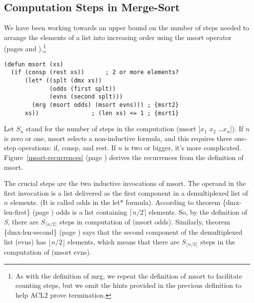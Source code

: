 \subsection{Computation Steps in Merge-Sort}
\label{subsec:msort-steps}

We have been working towards an upper bound on the number of steps
needed to arrange the elements of a list into increasing order
using the \textsf{msort} operator
(pages \pageref{defun:msort} and \pageref{defun:msort-copy}).\footnote{As
with the definition of \textsf{mrg}, we repeat the definition of \textsf{msort}
to facilitate counting steps, but we omit the hints
provided in the previous definition to help ACL2 prove termination.}

\begin{code}
\begin{verbatim}
(defun msort (xs)
  (if (consp (rest xs))      ; 2 or more elements?
      (let* ((splt (dmx xs))
             (odds (first splt))
             (evns (second splt)))
        (mrg (msort odds) (msort evns))) ; {msrt2}
      xs))               ; (len xs) <= 1 ; {msrt1}
\end{verbatim}
\end{code}
\label{defun:msort-copy}

Let $S_n$ stand for the number of steps in the computation
\textsf{(msort [$x_1$ $x_2$ \dots $x_n$])}.
If $n$ is zero or one, \textsf{msort} selects a non-inductive
formula, and this requires three one-step operations:
\textsf{if}, \textsf{consp}, and \textsf{rest}.
If $n$ is two or bigger, it's more complicated.
Figure~\ref{msort-recurrences} (page \pageref{msort-recurrences})
derives the recurrences from the definition of \textsf{msort}.

The crucial steps are the two inductive invocations of \textsf{msort}.
The operand in the first invocation is a list delivered as the first component in
a demultiplexed list of $n$ elements.
(It is called \textsf{odds} in the \textsf{let$*$} formula).
According to theorem \{dmx-len-first\} (page \pageref{thm:dmx-length-first-second})
\textsf{odds} is a list containing $\lceil  n/2\rceil$ elements.
So, by the definition of \emph{S},
there are $S_{\lceil n/2\rceil}$ steps in computation of \textsf{(msort odds)}.
Similarly, theorem  \{dmx-len-second\} (page \pageref{thm:dmx-length-first-second})
says that the second component of the demultiplexed list (\textsf{evns})
has $\lfloor n/2\rfloor$ elements, which means that there are
$S_{\lfloor n/2\rfloor}$ steps in the computation of \textsf{(msort evns)}.

